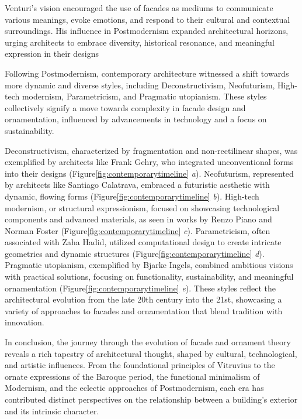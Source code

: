 Venturi's vision encouraged the use of facades as mediums to communicate various meanings, evoke emotions, and respond to their cultural and contextual surroundings.
His influence in Postmodernism expanded architectural horizons, urging architects to embrace diversity, historical resonance, and meaningful expression in their designs\cite{Lutolli2020, Stamp2016}


Following Postmodernism, contemporary architecture witnessed a shift towards more dynamic and diverse styles, including Deconstructivism, Neofuturism, High-tech modernism, Parametricism, and Pragmatic utopianism.
These styles collectively signify a move towards complexity in facade design and ornamentation, influenced by advancements in technology and a focus on sustainability.

Deconstructivism, characterized by fragmentation and non-rectilinear shapes, was exemplified by architects like Frank Gehry, who integrated unconventional forms into their designs (Figure\ref{fig:contemporarytimeline} \textit{a}).
Neofuturism, represented by architects like Santiago Calatrava, embraced a futuristic aesthetic with dynamic, flowing forms (Figure\ref{fig:contemporarytimeline} \textit{b}).
High-tech modernism, or structural expressionism, focused on showcasing technological components and advanced materials, as seen in works by Renzo Piano and Norman Foster (Figure\ref{fig:contemporarytimeline} \textit{c}).
Parametricism, often associated with Zaha Hadid, utilized computational design to create intricate geometries and dynamic structures (Figure\ref{fig:contemporarytimeline} \textit{d}).
Pragmatic utopianism, exemplified by Bjarke Ingels, combined ambitious visions with practical solutions, focusing on functionality, sustainability, and meaningful ornamentation (Figure\ref{fig:contemporarytimeline} \textit{e}).
These styles reflect the architectural evolution from the late 20th century into the 21st, showcasing a variety of approaches to facades and ornamentation that blend tradition with innovation.


In conclusion, the journey through the evolution of facade and ornament theory reveals a rich tapestry of architectural thought, shaped by cultural, technological, and artistic influences.
From the foundational principles of Vitruvius to the ornate expressions of the Baroque period, the functional minimalism of Modernism, and the eclectic approaches of Postmodernism, each era has contributed distinct perspectives on the relationship between a building's exterior and its intrinsic character.

